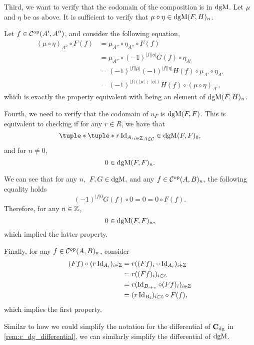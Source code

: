 \begin{remark}
    Third, we want to verify that the codomain of the composition is in \( \operatorname{dgM} \). Let \( \mu \) and \( \eta \) be as above. It is sufficient to verify that \( \mu \circ \eta \in \operatorname{dgM}(F, H)_n \).

    Let \( f \in {\mathcal{C}}^{\operatorname{op}}(A', A'') \), and consider the following equation,
    \begin{align*}
        (\mu \circ \eta)_{A''} \circ F(f) &= \mu_{A''} \circ \eta_{A''} \circ F(f) \\
        &= \mu_{A''} \circ (-1)^{|f||\eta|} G(f) \circ \eta_{A'} \\
        &= (-1)^{|f||\mu|}(-1)^{|f||\eta|} H(f) \circ \mu_{A'} \circ \eta_{A'} \\
        &= (-1)^{|f|(|\mu| + |\eta|)} H(f) \circ (\mu \circ \eta)_{A'},
    \end{align*}
    which is exactly the property equivalent with being an element of \( \operatorname{dgM}(F, H)_n \).

    Fourth, we need to verify that the codomain of \( u_F \) is \( \operatorname{dgM}(F, F) \). This is equivalent to checking if for any \( r \in R \), we have that
    \[
        \tuple*{ \tuple*{ r \Id_{A_i} }_{i \in \Zb} }_{A \in \Cc} \in \dgM(F, F)_0,
    \]
    and for \( n \neq 0 \),
    \[
        0 \in \operatorname{dgM}(F, F)_n.
    \]

    We can see that for any \( n, \) \( F, G \in \operatorname{dgM}, \) and any \( f \in {\mathcal{C}}^{\operatorname{op}}(A, B)_n, \) the following equality holds
    \[
        (-1)^{|f|0}G(f) \circ 0 = 0 = 0 \circ F(f).
    \]
    Therefore, for any \( n \in {\mathbb{Z}} \),
    \[
        0 \in \operatorname{dgM}(F, F)_n,
    \]
    which implied the latter property.

    Finally, for any \( f \in {\mathcal{C}}^{\operatorname{op}}(A, B)_n \), consider
    \begin{align*}
        (F f) \circ (r \operatorname{Id}_{A_i})_{i \in {\mathbb{Z}}} &= r ((F f)_i \circ \operatorname{Id}_{A_i})_{i \in {\mathbb{Z}}} \\
        &= r ((F f)_i)_{i \in {\mathbb{Z}}} \\
        &= r (\operatorname{Id}_{B_{i + n}} \circ (F f)_i)_{i \in {\mathbb{Z}}} \\
        &= (r \operatorname{Id}_{B_i})_{i \in {\mathbb{Z}}} \circ F(f),
    \end{align*}
    which implies the first property.
\end{remark}

Similar to how we could simplify the notation for the differential of \( \operatorname{\mathbf{C}}_{\operatorname{dg}} \) in \autoref{rem:c_dg_differential}, we can similarly simplify the differential of \( \operatorname{dgM} \).

